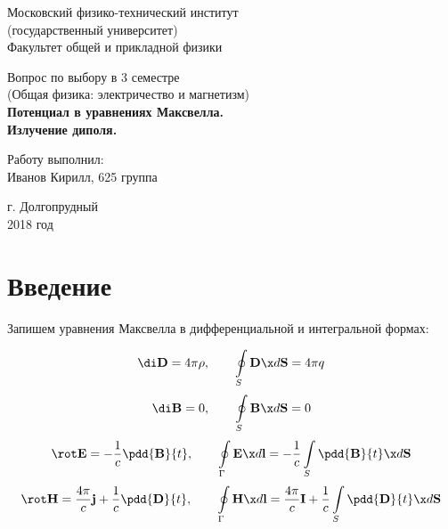 \documentclass[12pt]{kiarticle}
\begin{document}
	
	\begin{titlepage}
	\begin{center}
		\large 	Московский физико-технический институт \\
		(государственный университет) \\
		Факультет общей и прикладной физики \\
		\vspace{0.2cm}
		
		\vspace{4.5cm}
		Вопрос по выбору в 3 семестре \\ \vspace{0.2cm}
		\large (Общая физика: электричество и магнетизм) \\ \vspace{0.2cm}
		\LARGE \textbf{Потенциал в уравнениях Максвелла. \\ Излучение диполя.}
	\end{center}
	\vspace{2.3cm} \large
	
	\begin{center}
		Работу выполнил: \\
		Иванов Кирилл,
		625 группа
		\vspace{10mm}		
		
	\end{center}
	
	\begin{center} \vspace{60mm}
		г. Долгопрудный \\
		2018 год
	\end{center}
\end{titlepage}



\section{Введение}

Запишем уравнения Максвелла в дифференциальной и интегральной формах: 


\begin{equation}\label{Gauss_E}
\di \mathbf{D} = 4\pi\rho, \qquad
\oint\limits_S  \mathbf{D} \x d\mathbf{S} = 4\pi q
\end{equation}
\begin{equation}\label{Gauss_B}
\di \textbf{B} = 0 , \qquad
\oint\limits_S  \mathbf{B} \x d\mathbf{S} =  0
\end{equation}
\begin{equation}\label{Faradey}
\rot \mathbf{E} = -\dfrac{1}{c}\pdd{\mathbf{B}}{t}, \qquad \oint\limits_\Gamma \mathbf{E} \x d\mathbf{l} = - \dfrac{1}{c} \int\limits_S  \pdd{\mathbf{B}}{t} \x d\mathbf{S}
\end{equation}
\begin{equation}\label{Circ_H}
\rot \mathbf{H} = \dfrac{4\pi}{c}\mathbf{j} + \dfrac{1}{c}\pdd{\mathbf{D}}{t}, \qquad
\oint\limits_\Gamma \mathbf{H} \x d\mathbf{l} = \dfrac{4\pi}{c}\mathbf{I} + \dfrac{1}{c} \int\limits_S  \pdd{\mathbf{D}}{t} \x d\mathbf{S} 
\end{equation}
\end{document}
